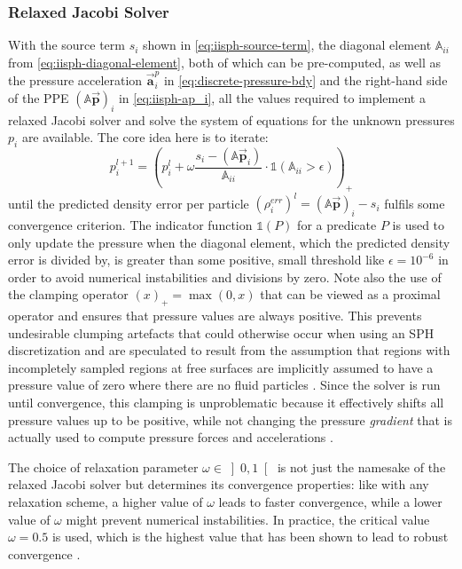 \documentclass[oneside, a4paper]{book}
\newcommand\vek[1]{\vec{\bm{#1}}}
\newcommand\br[1]{\left(#1\right)}
\begin{document}
    \subsubsection{Relaxed Jacobi Solver}\label{subsec:jacobi-solver}
    With the source term $s_i$ shown in \autoref{eq:iisph-source-term}, the diagonal element $\mathds{A}_{ii}$ from \autoref{eq:iisph-diagonal-element}, both of which can be pre-computed, as well as the pressure acceleration $\vek{a}_i^p$ in \autoref{eq:discrete-pressure-bdy} and the right-hand side of the PPE $\br{\mathds{A}\vek{p}}_i$ in \autoref{eq:iisph-ap_i}, all the values required to implement a relaxed Jacobi solver and solve the system of equations for the unknown pressures $p_i$ are available. The core idea here is to iterate:
    \begin{equation}
      p_i^{l+1} = \br{p_i^{l} + \omega \frac{s_i-\br{\mathds{A}\vek{p}_i}}{\mathds{A}_{ii}}\cdot\mathds{1}\br{\mathds{A}_{ii}>\epsilon}}_+\label{eq:iisph-relaxed-jacobi-iteration}
    \end{equation}
    until the predicted density error per particle $\br{\rho^{err}_i}^l = \br{\mathds{A}\vek{p}}_i-s_i$ fulfils some convergence criterion. The indicator function $\mathds{1}\br{P}$ for a predicate $P$ is used to only update the pressure when the diagonal element, which the predicted density error is divided by, is greater than some positive, small threshold like $\epsilon=10^{-6}$ in order to avoid numerical instabilities and divisions by zero. Note also the use of the clamping operator $\br{x}_+ = \max\br{0, x}$ that can be viewed as a proximal operator \autocite{monolithic-rigids-timo} and ensures that pressure values are always positive. This prevents undesirable clumping artefacts that could otherwise occur when using an SPH discretization \autocite{iisph} and are speculated to result from the assumption that regions with incompletely sampled regions at free surfaces are implicitly assumed to have a pressure value of zero where there are no fluid particles \autocite{tutorial2019}. Since the solver is run until convergence, this clamping is unproblematic because it effectively shifts all pressure values up to be positive, while not changing the pressure \textit{gradient} that is actually used to compute pressure forces and accelerations \autocite{tutorial2019}.

    The choice of relaxation parameter $\omega\in\left]0,1\right[$ is not just the namesake of the relaxed Jacobi solver but determines its convergence properties: like with any relaxation scheme, a higher value of $\omega$ leads to faster convergence, while a lower value of $\omega$ might prevent numerical instabilities. In practice, the critical value $\omega=0.5$ is used, which is the highest value that has been shown to lead to robust convergence \autocite{iisph}.
\end{document}
